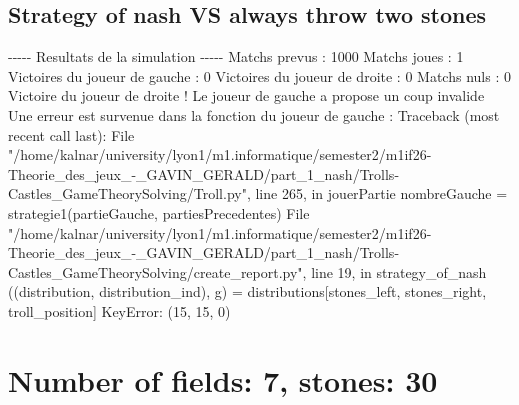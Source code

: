 \documentclass{article}%
\begin{document}
\subsection{Strategy of nash VS always throw two stones}%
\label{subsec:Strategy of nash VS always throw two stones}%
{-}{-}{-}{-}{-} Resultats de la simulation {-}{-}{-}{-}{-}\newline%
		\newline%
Matchs prevus : 1000\newline%
Matchs joues : 1\newline%
\newline%
Victoires du joueur de gauche : 0\newline%
Victoires du joueur de droite : 0\newline%
Matchs nuls : 0\newline%
\newline%
Victoire du joueur de droite ! Le joueur de gauche a propose un coup invalide\newline%
Une erreur est survenue dans la fonction du joueur de gauche : \newline%
Traceback (most recent call last):\newline%
  File "/home/kalnar/university/lyon1/m1.informatique/semester2/m1if26{-}Theorie\_des\_jeux\_{-}\_GAVIN\_GERALD/part\_1\_nash/Trolls{-}Castles\_GameTheorySolving/Troll.py", line 265, in jouerPartie\newline%
    nombreGauche = strategie1(partieGauche, partiesPrecedentes)\newline%
  File "/home/kalnar/university/lyon1/m1.informatique/semester2/m1if26{-}Theorie\_des\_jeux\_{-}\_GAVIN\_GERALD/part\_1\_nash/Trolls{-}Castles\_GameTheorySolving/create\_report.py", line 19, in strategy\_of\_nash\newline%
    ((distribution, distribution\_ind), g) = distributions{[}stones\_left, stones\_right, troll\_position{]}\newline%
KeyError: (15, 15, 0)\newline%

%
\section{Number of fields: 7, stones: 30}%
\label{sec:Number of fields 7, stones 30}%
\end{document}
